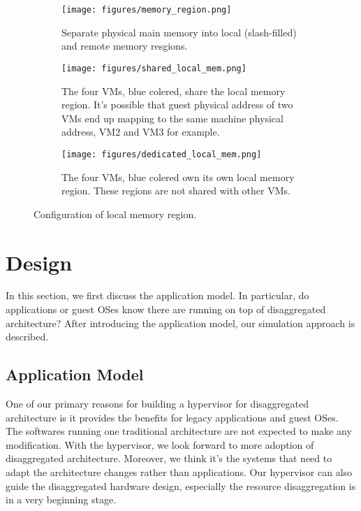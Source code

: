 \documentclass[twocolumn]{article}
\begin{document}
\begin{figure*}[h!]
     \centering
     \captionsetup[subfigure]{position=b}
     \begin{subfigure}[b]{\textwidth}
         \texttt{[image: figures/memory\_region.png]}
         \caption{Separate physical main memory into local (slash-filled) and remote memory resgions.}
         \label{fig:local memory regions}
     \end{subfigure}
     \hfill
     \begin{subfigure}[b]{\textwidth}
         \texttt{[image: figures/shared\_local\_mem.png]}
         \caption{The four VMs, blue colered, share the local memory region. It's possible that guest physical address of two VMs end up mapping to the same machine physical address, VM2 and VM3 for example.}
         \label{fig:shared local memory}
     \end{subfigure}
     \hfill
     \begin{subfigure}[b]{\textwidth}
         \texttt{[image: figures/dedicated\_local\_mem.png]}
         \caption{The four VMs, blue colered own its own local memory region. These regions are not shared with other VMs.}
         \label{fig:dedicated local memory}
     \end{subfigure}
     \caption{Configuration of local memory region.}
     \label{fig:local memory architecture}
\end{figure*}

\section{Design}
In this section, we first discuss the application model. In particular, do applications or guest OSes know there are running on top of disaggregated architecture? After introducing the application model, our simulation approach is described.

\subsection{Application Model}
One of our primary reasons for building a hypervisor for disaggregated architecture is it provides the benefits for legacy applications and guest OSes. The softwares running one traditional architecture are not expected to make any modification. With the hypervisor, we look forward to more adoption of disaggregated architecture. Moreover, we think it's the systems that need to adapt the architecture changes rather than applications. Our hypervisor can also guide the disaggregated hardware design, especially the resource disaggregation is in a very beginning stage.
\end{document}
